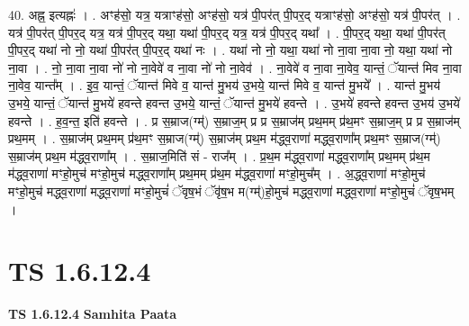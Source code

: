 \documentclass[17pt]{extarticle}
\begin{document}
40. अह्न॒ इत्यह्नः॑ । . अꣳह॑सो॒ यत्र॒ यत्राꣳह॑सो॒ अꣳह॑सो॒ यत्र॑ पी॒पर॑त् पी॒पर॒द् यत्राꣳह॑सो॒ अꣳह॑सो॒ यत्र॑ पी॒पर॑त् । . यत्र॑ पी॒पर॑त् पी॒पर॒द् यत्र॒ यत्र॑ पी॒पर॒द् यथा॒ यथा॑ पी॒पर॒द् यत्र॒ यत्र॑ पी॒पर॒द् यथा᳚ । . पी॒पर॒द् यथा॒ यथा॑ पी॒पर॑त् पी॒पर॒द् यथा॑ नो नो॒ यथा॑ पी॒पर॑त् पी॒पर॒द् यथा॑ नः । . यथा॑ नो नो॒ यथा॒ यथा॑ नो ना॒वा ना॒वा नो॒ यथा॒ यथा॑ नो ना॒वा । . नो॒ ना॒वा ना॒वा नो॑ नो ना॒वेवे॑ व ना॒वा नो॑ नो ना॒वेव॑ । . ना॒वेवे॑ व ना॒वा ना॒वेव॒ यान्तं॒ ॅयान्त॑ मिव ना॒वा ना॒वेव॒ यान्त᳚म् । . इ॒व॒ यान्तं॒ ॅयान्त॑ मिवे व॒ यान्त॑ मु॒भय॑ उ॒भये॒ यान्त॑ मिवे व॒ यान्त॑ मु॒भये᳚ । . यान्त॑ मु॒भय॑ उ॒भये॒ यान्तं॒ ॅयान्त॑ मु॒भये॑ हवन्ते हवन्त उ॒भये॒ यान्तं॒ ॅयान्त॑ मु॒भये॑ हवन्ते । . उ॒भये॑ हवन्ते हवन्त उ॒भय॑ उ॒भये॑ हवन्ते । . ह॒व॒न्त॒ इति॑ हवन्ते । . प्र स॒म्राज(ग्म्॑) स॒म्राज॒म् प्र प्र स॒म्राज॑म् प्रथ॒मम् प्र॑थ॒मꣳ स॒म्राज॒म् प्र प्र स॒म्राज॑म् प्रथ॒मम् । . स॒म्राज॑म् प्रथ॒मम् प्र॑थ॒मꣳ स॒म्राज(ग्म्॑) स॒म्राज॑म् प्रथ॒म म॑द्ध्व॒राणा॑ मद्ध्व॒राणा᳚म् प्रथ॒मꣳ स॒म्राज(ग्म्॑) स॒म्राज॑म् प्रथ॒म म॑द्ध्व॒राणा᳚म् । . स॒म्राज॒मिति॑ सं - राज᳚म् । . प्र॒थ॒म म॑द्ध्व॒राणा॑ मद्ध्व॒राणा᳚म् प्रथ॒मम् प्र॑थ॒म म॑द्ध्व॒राणा॑ मꣳहो॒मुच॑ मꣳहो॒मुच॑ मद्ध्व॒राणा᳚म् प्रथ॒मम् प्र॑थ॒म म॑द्ध्व॒राणा॑ मꣳहो॒मुच᳚म् । . अ॒द्ध्व॒राणा॑ मꣳहो॒मुच॑ मꣳहो॒मुच॑ मद्ध्व॒राणा॑ मद्ध्व॒राणा॑ मꣳहो॒मुचं॑ ॅवृष॒भं ॅवृ॑ष॒भ म(ग्म्॑)हो॒मुच॑ मद्ध्व॒राणा॑ मद्ध्व॒राणा॑ मꣳहो॒मुचं॑ ॅवृष॒भम् । \newline
\pagebreak
{}
\section*{ TS 1.6.12.4 }

\textbf{TS 1.6.12.4 } \newline
\textbf{Samhita Paata} \newline
\end{document}
